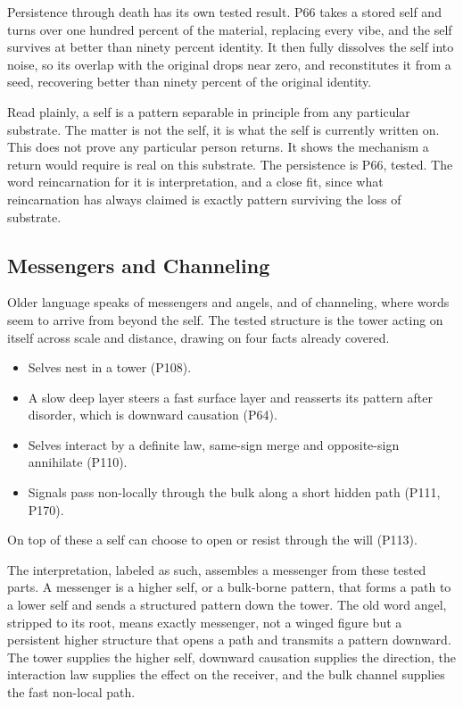 Persistence through death has its own tested result. P66 takes a stored self and turns over one hundred percent of the material, replacing every vibe, and the self survives at better than ninety percent identity. It then fully dissolves the self into noise, so its overlap with the original drops near zero, and reconstitutes it from a seed, recovering better than ninety percent of the original identity.

Read plainly, a self is a pattern separable in principle from any particular substrate. The matter is not the self, it is what the self is currently written on. This does not prove any particular person returns. It shows the mechanism a return would require is real on this substrate. The persistence is P66, tested. The word reincarnation for it is interpretation, and a close fit, since what reincarnation has always claimed is exactly pattern surviving the loss of substrate.

\subsection{Messengers and Channeling}

Older language speaks of messengers and angels, and of channeling, where words seem to arrive from beyond the self. The tested structure is the tower acting on itself across scale and distance, drawing on four facts already covered.

\begin{itemize}
\item Selves nest in a tower (P108).
\item A slow deep layer steers a fast surface layer and reasserts its pattern after disorder, which is downward causation (P64).
\item Selves interact by a definite law, same-sign merge and opposite-sign annihilate (P110).
\item Signals pass non-locally through the bulk along a short hidden path (P111, P170).
\end{itemize}

On top of these a self can choose to open or resist through the will (P113).

The interpretation, labeled as such, assembles a messenger from these tested parts. A messenger is a higher self, or a bulk-borne pattern, that forms a path to a lower self and sends a structured pattern down the tower. The old word angel, stripped to its root, means exactly messenger, not a winged figure but a persistent higher structure that opens a path and transmits a pattern downward. The tower supplies the higher self, downward causation supplies the direction, the interaction law supplies the effect on the receiver, and the bulk channel supplies the fast non-local path.

